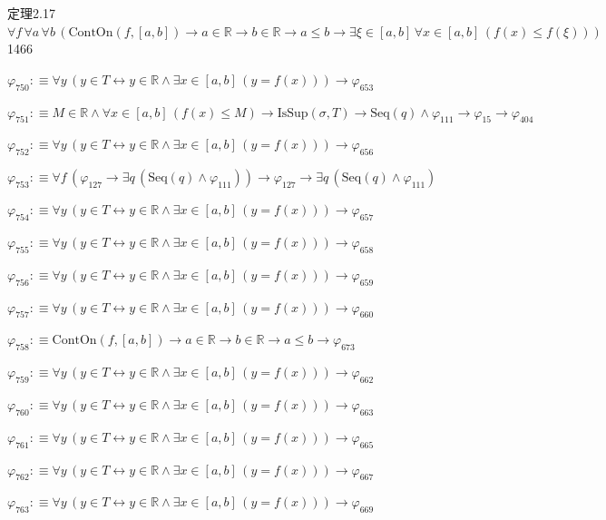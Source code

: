 \begin{fullproof}{定理2.17}{$\forall f\,\forall a\,\forall b\,(\mathrm{ContOn}(f,[a,b]) \to a \in \mathbb{R} \to b \in \mathbb{R} \to a \leq b \to \exists \xi \in [a,b]\,\forall x \in [a,b]\,(f(x) \leq f(\xi)))$}{1466}
\begin{abbrevlist}
\item $\varphi_{750} :\equiv \forall y\,(y \in T \leftrightarrow y \in \mathbb{R} \land \exists x \in [a,b]\,(y = f(x))) \to \varphi_{653}$
\item $\varphi_{751} :\equiv M \in \mathbb{R} \land \forall x \in [a,b]\,(f(x) \leq M) \to \mathrm{IsSup}(\sigma,T) \to \mathrm{Seq}(q) \land \varphi_{111} \to \varphi_{15} \to \varphi_{404}$
\item $\varphi_{752} :\equiv \forall y\,(y \in T \leftrightarrow y \in \mathbb{R} \land \exists x \in [a,b]\,(y = f(x))) \to \varphi_{656}$
\item $\varphi_{753} :\equiv \forall f\,(\varphi_{127} \to \exists q\,(\mathrm{Seq}(q) \land \varphi_{111})) \to \varphi_{127} \to \exists q\,(\mathrm{Seq}(q) \land \varphi_{111})$
\item $\varphi_{754} :\equiv \forall y\,(y \in T \leftrightarrow y \in \mathbb{R} \land \exists x \in [a,b]\,(y = f(x))) \to \varphi_{657}$
\item $\varphi_{755} :\equiv \forall y\,(y \in T \leftrightarrow y \in \mathbb{R} \land \exists x \in [a,b]\,(y = f(x))) \to \varphi_{658}$
\item $\varphi_{756} :\equiv \forall y\,(y \in T \leftrightarrow y \in \mathbb{R} \land \exists x \in [a,b]\,(y = f(x))) \to \varphi_{659}$
\item $\varphi_{757} :\equiv \forall y\,(y \in T \leftrightarrow y \in \mathbb{R} \land \exists x \in [a,b]\,(y = f(x))) \to \varphi_{660}$
\item $\varphi_{758} :\equiv \mathrm{ContOn}(f,[a,b]) \to a \in \mathbb{R} \to b \in \mathbb{R} \to a \leq b \to \varphi_{673}$
\item $\varphi_{759} :\equiv \forall y\,(y \in T \leftrightarrow y \in \mathbb{R} \land \exists x \in [a,b]\,(y = f(x))) \to \varphi_{662}$
\item $\varphi_{760} :\equiv \forall y\,(y \in T \leftrightarrow y \in \mathbb{R} \land \exists x \in [a,b]\,(y = f(x))) \to \varphi_{663}$
\item $\varphi_{761} :\equiv \forall y\,(y \in T \leftrightarrow y \in \mathbb{R} \land \exists x \in [a,b]\,(y = f(x))) \to \varphi_{665}$
\item $\varphi_{762} :\equiv \forall y\,(y \in T \leftrightarrow y \in \mathbb{R} \land \exists x \in [a,b]\,(y = f(x))) \to \varphi_{667}$
\item $\varphi_{763} :\equiv \forall y\,(y \in T \leftrightarrow y \in \mathbb{R} \land \exists x \in [a,b]\,(y = f(x))) \to \varphi_{669}$

\end{abbrevlist}
\end{fullproof}
